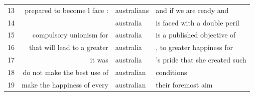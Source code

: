 \documentclass{beamer}       %
\begin{document}
\begin{frame}
\begin{table}
\begin{tabular}{lrll}
  13 &      prepared to become l face : & australians  & and if we are ready and \\
  14 &                                  & australia    & is faced with a double peril \\
  15 &          compulsory unionism for & australia    & is a published objective of \\
  16 &      that will lead to a greater & australia    & , to greater happiness for \\
  17 &                           it was & australia    & 's pride that she created such \\
  18 &      do not make the best use of & australian   & conditions \\
  19 &      make the happiness of every & australian   & their foremost aim \\

\end{tabular}
\end{table}
\end{frame}
\end{document}
